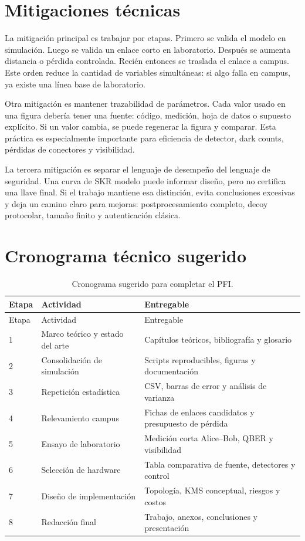 \section{Mitigaciones técnicas}

La mitigación principal es trabajar por etapas. Primero se valida el modelo en simulación. Luego se valida un enlace corto en laboratorio. Después se aumenta distancia o pérdida controlada. Recién entonces se traslada el enlace a campus. Este orden reduce la cantidad de variables simultáneas: si algo falla en campus, ya existe una línea base de laboratorio.

Otra mitigación es mantener trazabilidad de parámetros. Cada valor usado en una figura debería tener una fuente: código, medición, hoja de datos o supuesto explícito. Si un valor cambia, se puede regenerar la figura y comparar. Esta práctica es especialmente importante para eficiencia de detector, dark counts, pérdidas de conectores y visibilidad.

La tercera mitigación es separar el lenguaje de desempeño del lenguaje de seguridad. Una curva de SKR modelo puede informar diseño, pero no certifica una llave final. Si el trabajo mantiene esa distinción, evita conclusiones excesivas y deja un camino claro para mejoras: postprocesamiento completo, decoy protocolar, tamaño finito y autenticación clásica.

\section{Cronograma técnico sugerido}

\begin{longtable}{p{}p{}p{}}
  \caption{Cronograma sugerido para completar el PFI.}
  \label{tab:cronograma}\\
  \toprule
  Etapa & Actividad & Entregable \\
  \midrule
  \endfirsthead
  \toprule
  Etapa & Actividad & Entregable \\
  \midrule
  \endhead
  1 & Marco teórico y estado del arte & Capítulos teóricos, bibliografía y glosario \\
  2 & Consolidación de simulación & Scripts reproducibles, figuras y documentación \\
  3 & Repetición estadística & CSV, barras de error y análisis de varianza \\
  4 & Relevamiento campus & Fichas de enlaces candidatos y presupuesto de pérdida \\
  5 & Ensayo de laboratorio & Medición corta Alice--Bob, QBER y visibilidad \\
  6 & Selección de hardware & Tabla comparativa de fuente, detectores y control \\
  7 & Diseño de implementación & Topología, KMS conceptual, riesgos y costos \\
  8 & Redacción final & Trabajo, anexos, conclusiones y presentación \\
  \bottomrule
\end{longtable}

